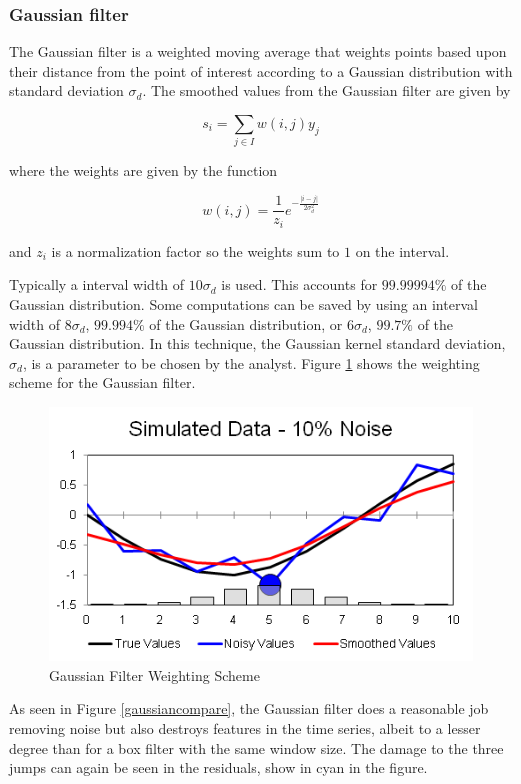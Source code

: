 \documentclass[11pt]{article}
\theoremstyle{definition}
\begin{document}
\FloatBarrier

\subsubsection{Gaussian filter} 
The Gaussian filter is a weighted moving average that weights points
based upon their distance from the point of interest according to a
Gaussian distribution with standard deviation $\sigma_d$. The smoothed
values from the Gaussian filter are given by

\begin{displaymath}
s_i = \sum _{j \in I} w \left(i, j \right) y_j
\end{displaymath}

\noindent
where the weights are given by the function

\begin{displaymath}
w\left(i, j\right) = \frac{1}{z_i} e^{-\frac{\lvert i - j \rvert}{2 \sigma_d^2}}
\end{displaymath}

\noindent
and $z_i$ is a normalization factor so the weights sum to $1$ on the interval.

Typically a interval width of $10 \sigma_d$ is used. This accounts for
$99.99994\%$ of the Gaussian distribution. Some computations can be
saved by using an interval width of $8 \sigma_d$, $99.994\%$ of the
Gaussian distribution, or $6 \sigma_d$, $99.7\%$ of the Gaussian
distribution. In this technique, the Gaussian kernel standard
deviation, $\sigma_d$, is a parameter to be chosen by the analyst.
Figure \ref{gaussiandemo} shows the weighting scheme for the Gaussian
filter.

\begin{figure}[h!]
\centering
\includegraphics[width = 0.4 \textwidth]{GaussianDemo.png}
\caption{Gaussian Filter Weighting Scheme}
\label{gaussiandemo}
\end{figure}

As seen in Figure \ref{gaussiancompare}, the Gaussian filter does a
reasonable job removing noise but also destroys features in the time
series, albeit to a lesser degree than for a box filter with the same
window size. The damage to the three jumps can again be seen in the
residuals, show in cyan in the figure.
\end{document}
